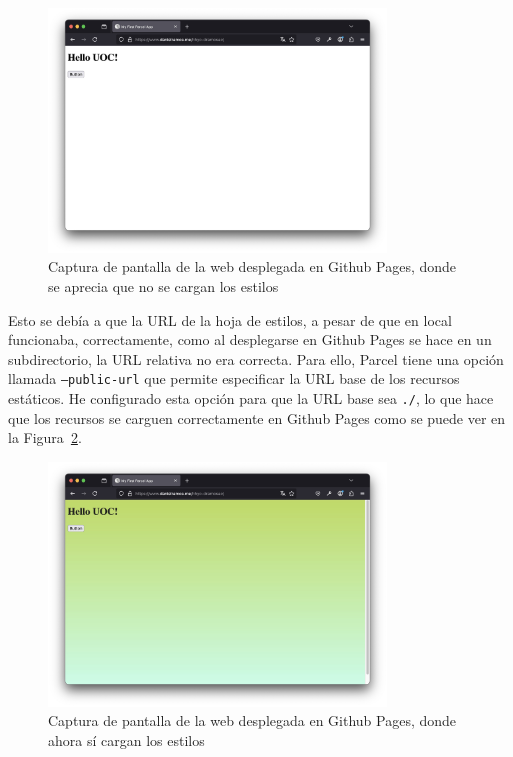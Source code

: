 \documentclass{article}
\begin{document}
\begin{figure}[h!]
    \centering
    \includegraphics[width=0.8\textwidth]{./img/web-semi-deployed}
    \caption{Captura de pantalla de la web desplegada en Github Pages, donde se aprecia que no se cargan los estilos}
    \label{fig:web-semi-deployed}
\end{figure}

Esto se debía a que la URL de la hoja de estilos, a pesar de que en local funcionaba, correctamente, como al desplegarse en Github Pages se hace en un subdirectorio, la URL relativa no era correcta. Para ello, Parcel tiene una opción llamada \texttt{--public-url} que permite especificar la URL base de los recursos estáticos. He configurado esta opción para que la URL base sea \texttt{./}, lo que hace que los recursos se carguen correctamente en Github Pages como se puede ver en la Figura~\ref{fig:web-deployed}.

\begin{figure}[h!]
    \centering
    \includegraphics[width=0.8\textwidth]{./img/web-deployed}
    \caption{Captura de pantalla de la web desplegada en Github Pages, donde ahora sí cargan los estilos}
    \label{fig:web-deployed}
\end{figure}
\end{document}

